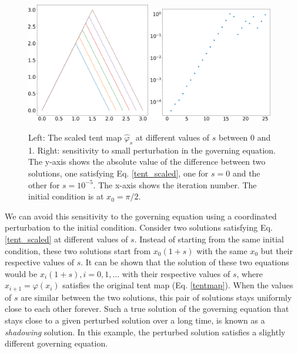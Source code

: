 \documentclass[preprint,12pt]{elsarticle}
\begin{document}
\begin{figure}   \centering
    \includegraphics[width=0.48\textwidth]{scaled_tent_map.png}
    \hspace{0.02\textwidth}
    \includegraphics[width=0.48\textwidth]{tent_ivp.png}
    \caption{Left: The scaled tent map $\hat{\varphi}_s$ at different values of $s$ between 0 and 1. Right: sensitivity to small perturbation in the governing
    equation.
    The y-axis shows the absolute value of the difference between
    two solutions, one satisfying Eq. \ref{tent_scaled},
    one for $s=0$ and the other for $s=10^{-5}$.
    The x-axis shows the iteration number.  The initial condition
    is at $x_0=\pi/2$.
    }
    \label{fig:tent_ivp}
\end{figure}

We can avoid this sensitivity to the governing equation using a coordinated perturbation to the initial condition.
Consider two solutions satisfying Eq. \ref{tent_scaled} at different values of $s$.  Instead of starting from the same
initial condition, these two solutions start from $x_0 (1 + s)$ with
the same $x_0$ but their respective values of $s$.  It can be shown that
the solution of these two equations would be
$x_i (1+s), i=0,1,\ldots$ with their respective values of $s$,
where $x_{i+1}=\varphi(x_i)$ satisfies the original
tent map (Eq. \ref{tentmap}).  When the values of $s$ are similar between
the two solutions, this pair of solutions stays uniformly close to each
other forever.  Such a true solution of the governing equation
that stays close to a given perturbed solution over a long time, is known as a \emph{shadowing} solution. In this example, the perturbed solution satisfies a 
slightly different governing equation.
\end{document}
